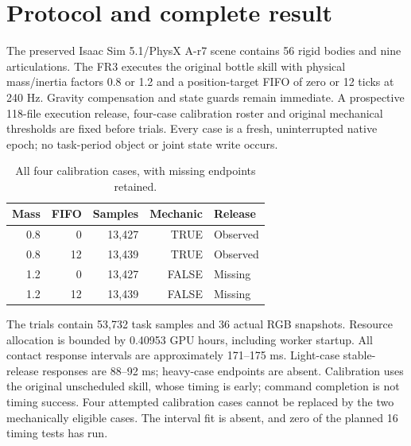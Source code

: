 \documentclass{article}
\begin{document}
\printAffiliationsAndNotice{}
\begin{abstract}
Physical-time scheduling is meaningful only when the preserved skill can
produce the required effective events. Four frozen Isaac Sim/PhysX FR3 calibration
trials complete all commands and pass independent raw consistency checks.
Two lighter-payload trials complete manipulation; two heavier-payload trials
lose transport grasp and have no stable-release endpoint. All four remain
in the calibration denominator. Consequently no interval fit or held-out
timing test is admitted. These retained negative observations expose a
mechanical qualification gap rather than a demonstrated scheduling or
learning improvement.
\end{abstract}

\section{Protocol and complete result}
The preserved Isaac Sim 5.1/PhysX A-r7 scene contains 56 rigid bodies and nine articulations.
The FR3 executes the original bottle skill with physical mass/inertia factors
0.8 or 1.2 and a position-target FIFO of zero or 12 ticks at 240 Hz.
Gravity compensation and state guards remain immediate. A prospective
118-file execution release, four-case calibration roster and original
mechanical thresholds are fixed before trials. Every case is a fresh,
uninterrupted native epoch; no task-period object or joint state write occurs.

\begin{table}[h]\centering\small
\caption{All four calibration cases, with missing endpoints retained.}
\begin{tabular}{rrrrl}\toprule
Mass & FIFO & Samples & Mechanic & Release\\\midrule
0.8 & 0 & 13,427 & TRUE & Observed \\
0.8 & 12 & 13,439 & TRUE & Observed \\
1.2 & 0 & 13,427 & FALSE & Missing \\
1.2 & 12 & 13,439 & FALSE & Missing \\
\bottomrule\end{tabular}\end{table}
The trials contain 53,732 task samples and 36 actual RGB snapshots. Resource
allocation is bounded by 0.40953 GPU hours, including worker startup.
All contact response intervals are approximately 171--175 ms. Light-case
stable-release responses are 88--92 ms; heavy-case endpoints are absent.
Calibration uses the original unscheduled skill, whose timing is early;
command completion is not timing success. Four attempted calibration cases
cannot be replaced by the two mechanically eligible cases. The interval
fit is absent, and zero of the planned 16 timing tests has run.
\end{document}
